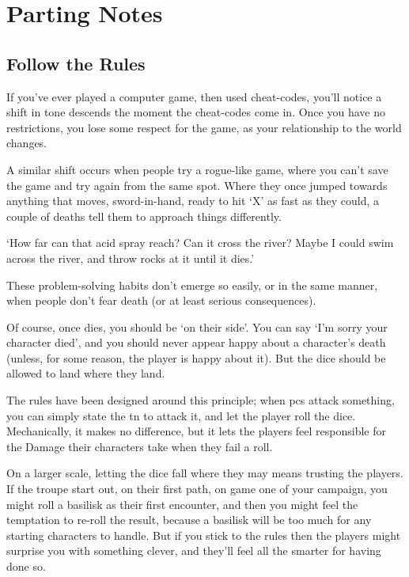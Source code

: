 \section{Parting Notes}

\begin{multicols}{2}

\subsection{Follow the Rules}

If you've ever played a computer game, then used cheat-codes, you'll notice a shift in tone descends the moment the cheat-codes come in.
Once you have no restrictions, you lose some respect for the game, as your relationship to the world changes.

A similar shift occurs when people try a rogue-like game, where you can't save the game and try again from the same spot.
Where they once jumped towards anything that moves, sword-in-hand, ready to hit `X' as fast as they could, a couple of deaths tell them to approach things differently.

\begin{speechtext}
  `How far can that acid spray reach?
  Can it cross the river?
  Maybe I could swim across the river, and throw rocks at it until it dies.'
\end{speechtext}

These problem-solving habits don't emerge so easily, or in the same manner, when people don't fear death (or at least serious consequences).

Of course, once  dies, you should be `on their side'.
You can say `I'm sorry your character died', and you should never appear happy about a character's death (unless, for some reason, the player is happy about it).
But the dice should be allowed to land where they land.

The rules have been designed around this principle; when \glspl{pc} attack something, you can simply state the \gls{tn} to attack it, and let the player roll the dice.
Mechanically, it makes no difference, but it lets the players feel responsible for the Damage their characters take when they fail a roll.

On a larger scale, letting the dice fall where they may means trusting the players.
If the troupe start out, on their first path, on game one of your campaign, you might roll a basilisk as their first encounter, and then you might feel the temptation to re-roll the result, because a basilisk will be too much for any starting characters to handle.
But if you stick to the rules then the players might surprise you with something clever, and they'll feel all the smarter for having done so.


\end{multicols}
